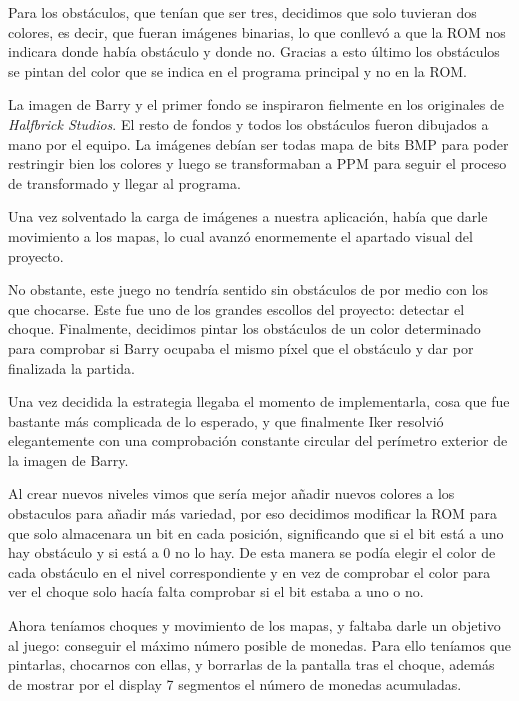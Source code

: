 \documentclass[11pt, a4paper, spanish, openright, twoside]{book}
\begin{document}
Para los obstáculos, que tenían que ser tres, decidimos que solo tuvieran dos colores, es decir, que fueran imágenes binarias, lo que conllevó a que la ROM nos indicara donde había obstáculo y donde no. Gracias a esto último los obstáculos se pintan del color que se indica en el programa principal y no en la ROM.

La imagen de Barry y el primer fondo se inspiraron fielmente en los originales de \emph{Halfbrick Studios}. El resto de fondos y todos los obstáculos fueron dibujados a mano por el equipo. La imágenes debían ser todas mapa de bits BMP para poder restringir bien los colores y luego se transformaban a PPM para seguir el proceso de transformado y llegar al programa.





Una vez solventado la carga de imágenes a nuestra aplicación, había que darle movimiento a los mapas, lo cual avanzó enormemente el apartado visual del proyecto.



No obstante, este juego no tendría sentido sin obstáculos de por medio con los que chocarse.
Este fue uno de los grandes escollos del proyecto: detectar el choque.
Finalmente, decidimos pintar los obstáculos de un color determinado para comprobar si Barry ocupaba el mismo píxel que el obstáculo y dar por finalizada la partida.

Una vez decidida la estrategia llegaba el momento de implementarla, cosa que fue bastante más complicada de lo esperado, y que finalmente Iker resolvió elegantemente con una comprobación constante circular del perímetro exterior de la imagen de Barry.

Al crear nuevos niveles vimos que sería mejor añadir nuevos colores a los obstaculos para añadir más variedad, por eso decidimos modificar la ROM para que solo almacenara un bit en cada posición, significando que si el bit está a uno hay obstáculo y si está a 0 no lo hay. De esta manera se podía elegir el color de cada obstáculo en el nivel correspondiente y en vez de comprobar el color para ver el choque solo hacía falta comprobar si el bit estaba a uno o no. 


Ahora teníamos choques y movimiento de los mapas, y faltaba darle un objetivo al juego: conseguir el máximo número posible de monedas. Para ello teníamos que pintarlas, chocarnos con ellas, y borrarlas de la pantalla tras el choque, además de mostrar por el display 7 segmentos el número de monedas acumuladas.
\end{document}
